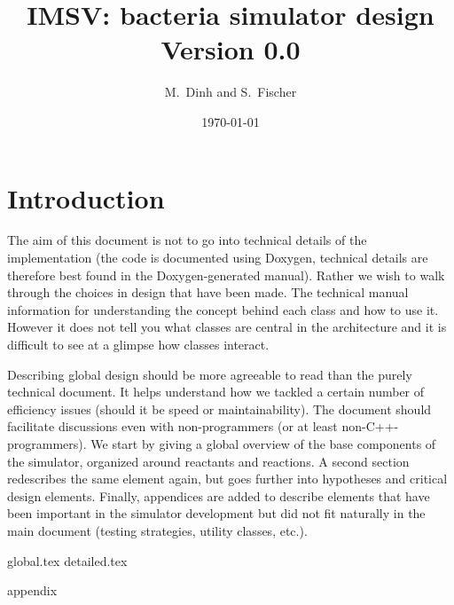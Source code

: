 \documentclass[12pt]{scrartcl}
\theoremstyle{definition}
\theoremstyle{remark}
\numberwithin{equation}{section}
\begin{document}
\title{{IMSV}: bacteria simulator design \\ Version 0.0}%
\author{M.~Dinh and S.~Fischer}%
\date{\today}%
\maketitle

\newpage

\tableofcontents

\newpage

\section{Introduction}

The aim of this document is not to go into technical details of the implementation (the code is documented using Doxygen, technical details are therefore best found in the Doxygen-generated manual). Rather we wish to walk through the choices in design that have been made. The technical manual information for understanding the concept behind each class and how to use it. However it does not tell you what classes are central in the architecture and it is difficult to see at a glimpse how classes interact.

Describing global design should be more agreeable to read than the purely technical document. It helps understand how we tackled a certain number of efficiency issues (should it be speed or maintainability). The document should facilitate discussions even with non-programmers (or at least non-C++-programmers). We start by giving a global overview of the base components of the simulator, organized around reactants and reactions. A second section redescribes the same element again, but goes further into hypotheses and critical design elements. Finally, appendices are added to describe elements that have been important in the simulator development but did not fit naturally in the main document (testing strategies, utility classes, etc.).

{global.tex}
{detailed.tex}
\clearpage

\appendix
{appendix}
\clearpage



\end{document}
